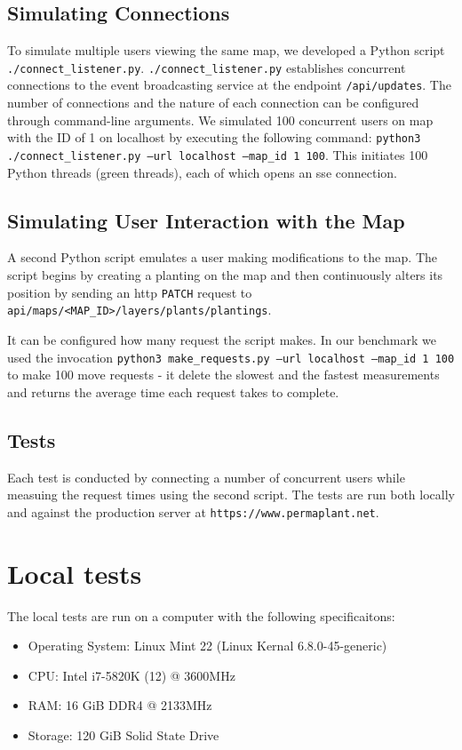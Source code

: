 \documentclass[final,draft]{vutinfth} %
\begin{document}
\subsection{Simulating Connections}
To simulate multiple users viewing the same map, we developed a Python script \texttt{./connect\_listener.py}.
\texttt{./connect\_listener.py} establishes concurrent connections to the event broadcasting service at the endpoint \texttt{/api/updates}.
The number of connections and the nature of each connection can be configured through command-line arguments.
We simulated 100 concurrent users on map with the ID of 1 on localhost by executing the following command: \texttt{python3 ./connect\_listener.py --url localhost --map\_id 1 100}.
This initiates 100 Python threads (green threads), each of which opens an \gls{sse} connection.  

\subsection{Simulating User Interaction with the Map}
A second Python script emulates a user making modifications to the map.
The script begins by creating a planting on the map and then continuously alters its position by sending an \gls{http} \texttt{PATCH} request to \texttt{api/maps/<MAP\_ID>/layers/plants/plantings}.

It can be configured how many request the script makes.
In our benchmark we used the invocation \texttt{python3 make\_requests.py --url localhost --map\_id 1 100} to make
100 move requests - it delete the slowest and the fastest measurements and returns the average time each request takes to complete.

\subsection{Tests}

Each test is conducted by connecting a number of concurrent users while measuing the request times using the second script. The tests are run both locally and against the production server at \texttt{https://www.permaplant.net}.

\section{Local tests}

The local tests are run on a computer with the following specificaitons:
\begin{itemize}
  \item Operating System: Linux Mint 22 (Linux Kernal 6.8.0-45-generic)
  \item CPU: Intel i7-5820K (12) @ 3600MHz
  \item RAM: 16 GiB DDR4 @ 2133MHz
  \item Storage: 120 GiB Solid State Drive
\end{itemize}
\end{document}
